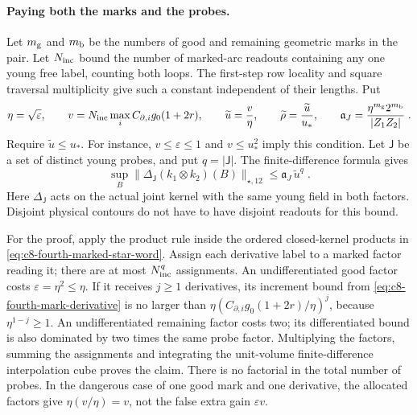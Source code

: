 \documentclass[11pt]{article}
\begin{document}
\paragraph{Paying both the marks and the probes.}
Let $m_{\rm g}$ and $m_{\rm b}$ be the numbers of good and
remaining geometric marks in the pair. Let $N_{\rm inc}$
bound the number of marked-arc readouts containing any one
young free label, counting both loops. The first-step row
locality and square traversal multiplicity give such a
constant independent of their lengths. Put
\begin{equation}\label{eq:c8-fourth-grade-parameters}
    \eta=\sqrt{\varepsilon},\qquad
    v=N_{\rm inc}\max_i C_{\partial,i}g_0(1+2r),\qquad
    \widetilde u=\frac{v}{\eta},\qquad
    \widetilde\rho=\frac{\widetilde u}{u_*},\qquad
    \mathfrak a_J=\frac{\eta^{m_{\rm g}}2^{m_{\rm b}}}{|Z_1Z_2|}\;.
\end{equation}
Require $\widetilde u\leq u_*$. For instance,
$v\leq\varepsilon\leq1$ and $v\leq u_*^2$ imply this
condition. Let $\mathsf J$ be a set of distinct young probes,
and put $q=|\mathsf J|$. The finite-difference formula gives
\begin{equation}\label{eq:c8-fourth-fixed-mark-difference}
    \sup_B\|
        \Delta_{\mathsf J}(k_1\otimes k_2)(B)
    \|_{\star,12}
        \leq\mathfrak a_J\,\widetilde u^q\;.
\end{equation}
Here $\Delta_{\mathsf J}$ acts on the actual joint kernel
with the same young field in both factors. Disjoint
physical contours do not have to have disjoint readouts
for this bound.

For the proof, apply the product rule inside the ordered
closed-kernel products in
\eqref{eq:c8-fourth-marked-star-word}.
Assign each derivative label to a marked factor reading it;
there are at most $N_{\rm inc}^q$ assignments.
An undifferentiated good factor costs
$\varepsilon=\eta^2\leq\eta$. If it receives $j\geq1$
derivatives, its increment bound from
\eqref{eq:c8-fourth-mark-derivative} is no larger than
$\eta(C_{\partial,i}g_0(1+2r)/\eta)^j$,
because $\eta^{1-j}\geq1$.
An undifferentiated remaining factor costs two; its
differentiated bound is also dominated by two times the
same probe factor. Multiplying the factors, summing the
assignments and integrating the unit-volume
finite-difference interpolation cube proves the claim.
There is no factorial in the total number of probes.
In the dangerous case of one good mark and one derivative,
the allocated factors give $\eta(v/\eta)=v$, not the false
extra gain $\varepsilon v$.
\end{document}
